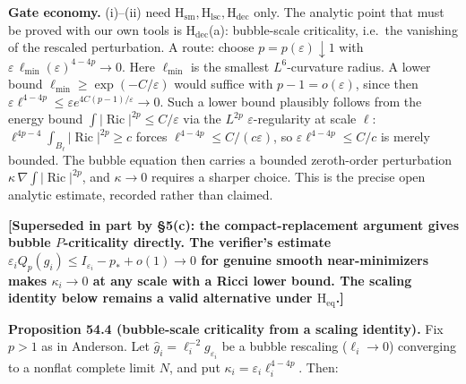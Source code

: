 \documentclass[
  10pt,
]{report}
\begin{document}
\textbf{Gate economy.} (i)--(ii) need
\(\mathrm{H_{sm}},\mathrm{H_{lsc}},\mathrm{H_{dec}}\) only. The analytic
point that must be proved with our own tools is \(\mathrm{H_{dec}}\)(a):
bubble-scale criticality, i.e.~the vanishing of the rescaled
perturbation. A route: choose \(p=p(\varepsilon)\downarrow1\) with
\(\varepsilon\,\ell_{\min}(\varepsilon)^{4-4p}\to0\). Here
\(\ell_{\min}\) is the smallest \(L^6\)-curvature radius. A lower bound
\(\ell_{\min}\ge\exp(-C/\varepsilon)\) would suffice with
\(p-1=o(\varepsilon)\), since then
\(\varepsilon\ell^{4-4p}\le\varepsilon e^{4C(p-1)/\varepsilon}\to0\).
Such a lower bound plausibly follows from the energy bound
\(\int|\operatorname{Ric}|^{2p}\le C/\varepsilon\) via the \(L^{2p}\)
\(\varepsilon\)-regularity at scale \(\ell\):
\(\ell^{4p-4}\int_{B_\ell}|\operatorname{Ric}|^{2p}\ge c\) forces
\(\ell^{4-4p}\le C/(c\varepsilon)\), so
\(\varepsilon\ell^{4-4p}\le C/c\) is merely bounded. The bubble equation
then carries a bounded zeroth-order perturbation
\(\kappa\,\nabla\!\int|\operatorname{Ric}|^{2p}\), and \(\kappa\to0\)
requires a sharper choice. This is the precise open analytic estimate,
recorded rather than claimed.

\textbf{{[}Superseded in part by §5(c): the compact-replacement argument
gives bubble \(P\)-criticality directly. The verifier's estimate
\(\varepsilon_iQ_p(g_i)\le I_{\varepsilon_i}-p_*+o(1)\to0\) for genuine
smooth near-minimizers makes \(\kappa_i\to0\) at any scale with a Ricci
lower bound. The scaling identity below remains a valid alternative
under \(\mathrm{H_{eq}}\).{]}}

\textbf{Proposition 54.4 (bubble-scale criticality from a scaling
identity).} Fix \(p>1\) as in Anderson. Let
\(\hat g_i=\ell_i^{-2}g_{\varepsilon_i}\) be a bubble rescaling
(\(\ell_i\to0\)) converging to a nonflat complete limit \(N\), and put
\(\kappa_i=\varepsilon_i\ell_i^{4-4p}\). Then:
\end{document}
